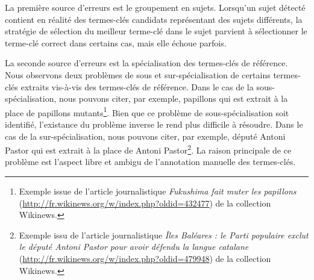           La première source d'erreurs est le groupement en sujets. Lorsqu'un
          sujet détecté contient en réalité des termes-clés candidats
          représentant des sujets différents, la stratégie de sélection du
          meilleur terme-clé dans le sujet parvient à sélectionner le terme-clé
          correct dans certains cas, mais elle échoue parfois.


          La seconde source d'erreurs est la spécialisation des termes-clés de
          référence. Nous observons deux problèmes de sous et sur-spécialisation
          de certains termes-clés extraits vis-à-vis des termes-clés de
          référence. Dans le cas de la sous-spécialisation, nous pouvons citer,
          par exemple, \og{}papillons\fg{} qui est extrait à la place de
          \og{}papillons mutants\fg{}\footnote{Exemple issue de l'article
          journalistique \textit{Fukushima fait muter les papillons}
          (\url{http://fr.wikinews.org/w/index.php?oldid=432477}) de la
          collection Wikinews.}. Bien que ce problème de sous-spécialisation
          soit identifié, l'existance du problème inverse le rend plus difficile
          à résoudre. Dans le cas de la sur-spécialisation, nous pouvons citer,
          par exemple, \og{}député Antoni Pastor\fg{} qui est extrait à la place
          de \og{}Antoni Pastor\fg{}\footnote{Exemple issu de l'article
          journalistique \textit{Îles Baléares : le Parti populaire exclut le
          député Antoni Pastor pour avoir défendu la langue catalane}
          (\url{http://fr.wikinews.org/w/index.php?oldid=479948}) de la
          collection Wikinews.}. La raison principale de ce problème est
          l'aspect libre et ambigu de l'annotation manuelle des termes-clés.

